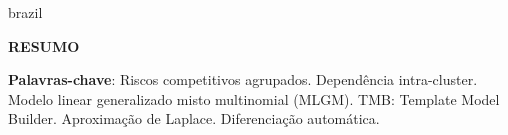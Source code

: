 \documentclass[12pt, %
               openright, %
               oneside, %
               a4paper, %
               chapter=TITLE, %
               section=TITLE, %
               brazil,
               english %
]{abntex2}
\begin{document}
\newpage
\setlength{\absparsep}{18pt} %
\setlength{\abstitleskip}{1cm} %
\begin{resumo}[]
  \begin{otherlanguage*}{brazil}
    \vspace{-2cm}
    \begin{center}
      \bfseries{\large{\textsf{RESUMO}}}
    \end{center}
    \vspace{0.3cm}

    \textbf{Palavras-chave}: Riscos competitivos agrupados.
                             Depend\^{e}ncia intra-cluster.
                             Modelo linear generalizado misto
                             multinomial (MLGM).
                             TMB: Template Model Builder.
                             Aproxima\c{c}\~{a}o de Laplace.
                             Diferencia\c{c}\~{a}o autom\'{a}tica.
  \end{otherlanguage*}
\end{resumo}
\listoffigures*
\cleardoublepage
\makeatletter
\renewcommand\numberline[1]{
	\leftskip -0.7em
	\rightskip 1.6em
	\parfillskip -\rightskip
	\parindent 0em
	\@tempdima 2.0em
	\vspace{0em}
  \advance\leftskip \@tempdima \null\nobreak\hskip -\leftskip
	ALGORITHM \normalfont #1 ~~ }
\makeatother
\listofalgorithms
\cleardoublepage
\makeatletter
\def\numberline#1{\hb@xt@\@tempdima{#1\hfil}}
\makeatother
\end{document}
